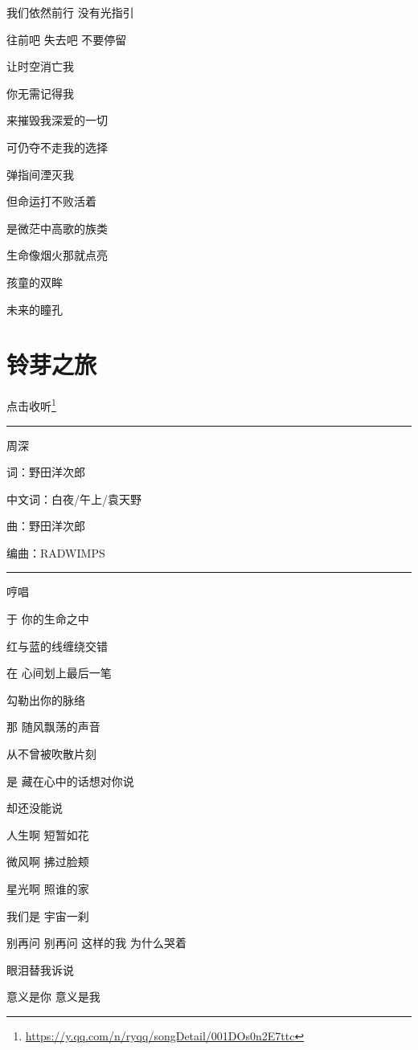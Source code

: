 \documentclass[]{ctexbook}
\renewcommand{\href}[2]{#2\footnote{\url{#1}}}
\begin{document}
我们依然前行 没有光指引

往前吧 失去吧 不要停留

让时空消亡我

你无需记得我

来摧毁我深爱的一切

可仍夺不走我的选择

弹指间湮灭我

但命运打不败活着

是微茫中高歌的族类

生命像烟火那就点亮

孩童的双眸

未来的瞳孔

\section*{铃芽之旅}\label{travel-lingya}


\href{https://y.qq.com/n/ryqq/songDetail/001DOs0n2E7ttc}{点击收听}

\begin{center}\rule{0.5\linewidth}{0.5pt}\end{center}

周深

词：野田洋次郎

中文词：白夜/午上/袁天野

曲：野田洋次郎

编曲：RADWIMPS

\begin{center}\rule{0.5\linewidth}{0.5pt}\end{center}

哼唱

于 你的生命之中

红与蓝的线缠绕交错

在 心间划上最后一笔

勾勒出你的脉络

那 随风飘荡的声音

从不曾被吹散片刻

是 藏在心中的话想对你说

却还没能说

人生啊 短暂如花

微风啊 拂过脸颊

星光啊 照谁的家

我们是 宇宙一刹

别再问 别再问 这样的我 为什么哭着

眼泪替我诉说

意义是你 意义是我
\end{document}
